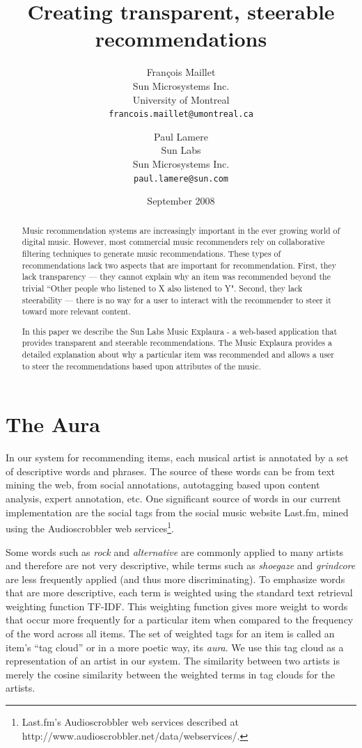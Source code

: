 \documentclass{article}
\title{Creating transparent, steerable recommendations}
\author{
Fran\c{c}ois Maillet\\
Sun Microsystems Inc.\\
University of Montreal\\
\texttt{francois.maillet@umontreal.ca}
\and 
Paul Lamere \\
Sun Labs\\
Sun Microsystems Inc.\\
\texttt{paul.lamere@sun.com}
}
\date{September 2008}
\begin{document}
\maketitle

\begin{abstract}

Music recommendation systems are increasingly important in the ever 
    growing world of digital music.  However, most commercial music 
    recommenders rely on collaborative filtering techniques to generate 
    music recommendations. These types of recommendations lack two aspects 
    that are important for recommendation.  First, they lack transparency 
    --- they cannot explain why an item was recommended beyond the trivial 
    ``Other people who listened to X also listened to Y". Second, they 
    lack steerability --- there is no way for a user to interact with the 
    recommender to steer it toward more relevant content.
    
    In this paper we describe the Sun Labs Music Explaura - a 
    web-based application that provides transparent and steerable 
    recommendations. The Music Explaura provides a detailed explanation 
    about why a particular item was recommended and allows a user to 
    steer the recommendations based upon attributes of the music.

\end{abstract}

\section{The Aura}

In our system for recommending items, each musical artist is annotated
by a set of descriptive words and phrases.  The source
of these words can be from text mining the web, from social
annotations, autotagging based upon content analysis, expert
annotation, etc.  One significant source of words in our current
implementation are the social tags from the social music website
Last.fm, mined using the Audioscrobbler web services\footnote{Last.fm's
Audioscrobbler web services described at
http://www.audioscrobbler.net/data/webservices/.}.

Some words such as \textit{rock} and \textit{alternative} are
commonly applied to many artists and therefore are not very descriptive,
while terms such as \textit{shoegaze} and \textit{grindcore} are
less frequently applied (and thus more discriminating).  To emphasize
words that are more descriptive, each term is weighted using the
standard text retrieval weighting function TF-IDF. This
weighting function gives more weight to words that occur more
frequently for a particular item when compared to the frequency of
the word across all items.  The set of weighted tags for an item
is called an item's ``tag cloud'' or in a more poetic way, its
\textit{aura}.  We use this tag cloud as a representation of
an artist in our system. The similarity between two artists is merely
the cosine similarity between the weighted terms in tag clouds for the artists.
\end{document}
